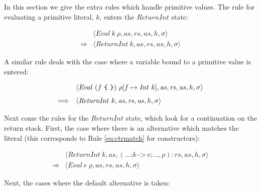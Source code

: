 \documentclass[10pt,a4paper]{exam} %
\begin{document}
In this section we give the extra rules which handle primitive values. The rule for evaluating a primitive literal, $k$, enters the $\mathit{ReturnInt}$ state:
\begin{mdframed}
\begin{equation}
\begin{array}{cl}
 & \langle \mathit{Eval}~k~\rho, \mathit{as}, \mathit{rs}, \mathit{us}, h, \sigma \rangle \\[0.25cm]
\Longrightarrow & \langle \mathit{ReturnInt}~k, \mathit{as}, \mathit{rs}, \mathit{us}, h, \sigma \rangle 
\end{array}
\end{equation}
\end{mdframed}
A similar rule deals with the case where a variable bound to a primitive value is entered:
\begin{mdframed}
\begin{equation}
\begin{array}{cl}
 & \langle \mathit{Eval}~(f~\texttt{\{\,\,\}})~\rho[f \mapsto \mathit{Int}~k], \mathit{as}, \mathit{rs}, \mathit{us}, h, \sigma \rangle \\[0.25cm]
\Longrightarrow & \langle \mathit{ReturnInt}~k, \mathit{as}, \mathit{rs}, \mathit{us}, h, \sigma \rangle 
\end{array}
\label{eqn:varint}
\end{equation}
\end{mdframed}
Next come the rules for the $\mathit{ReturnInt}$ state, which look for a continuation on the return stack. First, the case where there is an alternative which matches the literal (this corresponds to Rule \ref{eq:ctrmatch} for constructors):
\begin{mdframed}
\begin{equation}
\begin{array}{cl}
 & \langle \mathit{ReturnInt}~k, \mathit{as}, (\ldots \texttt{;} k~\texttt{->}~e \texttt{;} \ldots, \rho) : \mathit{rs}, \mathit{us}, h, \sigma \rangle \\[0.25cm]
\Longrightarrow & \langle \mathit{Eval}~e~\rho, \mathit{as}, \mathit{rs}, \mathit{us}, h, \sigma \rangle 
\end{array}
\end{equation}
\end{mdframed}
Next, the cases where the default alternative is taken:
\end{document}
